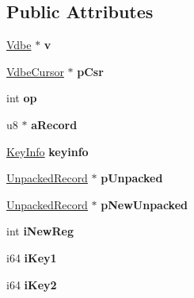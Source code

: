 \subsection*{Public Attributes}
\begin{DoxyCompactItemize}
\item 
\hyperlink{structVdbe}{Vdbe} $\ast$ {\bfseries v}\hypertarget{structPreUpdate_a6fccc7c418de1a789595f9814a4f5f81}{}\label{structPreUpdate_a6fccc7c418de1a789595f9814a4f5f81}

\item 
\hyperlink{structVdbeCursor}{Vdbe\+Cursor} $\ast$ {\bfseries p\+Csr}\hypertarget{structPreUpdate_a4716275b8f780b4f63f1a379a846c620}{}\label{structPreUpdate_a4716275b8f780b4f63f1a379a846c620}

\item 
int {\bfseries op}\hypertarget{structPreUpdate_aaecf3af9f7b62a4fd140d0d1300201cf}{}\label{structPreUpdate_aaecf3af9f7b62a4fd140d0d1300201cf}

\item 
u8 $\ast$ {\bfseries a\+Record}\hypertarget{structPreUpdate_a148cb72a74c7943828e02a5ce88ef662}{}\label{structPreUpdate_a148cb72a74c7943828e02a5ce88ef662}

\item 
\hyperlink{structKeyInfo}{Key\+Info} {\bfseries keyinfo}\hypertarget{structPreUpdate_a8bb920205df3c43820a81dcd3c1cf5bb}{}\label{structPreUpdate_a8bb920205df3c43820a81dcd3c1cf5bb}

\item 
\hyperlink{structUnpackedRecord}{Unpacked\+Record} $\ast$ {\bfseries p\+Unpacked}\hypertarget{structPreUpdate_ab43a1f36e6ab8c9aa8b1e52f1d80d07f}{}\label{structPreUpdate_ab43a1f36e6ab8c9aa8b1e52f1d80d07f}

\item 
\hyperlink{structUnpackedRecord}{Unpacked\+Record} $\ast$ {\bfseries p\+New\+Unpacked}\hypertarget{structPreUpdate_a70c572bb14af1dfdff8a1d6619548de0}{}\label{structPreUpdate_a70c572bb14af1dfdff8a1d6619548de0}

\item 
int {\bfseries i\+New\+Reg}\hypertarget{structPreUpdate_aadbf462d0c2b3d64387f9ece92ad2ed1}{}\label{structPreUpdate_aadbf462d0c2b3d64387f9ece92ad2ed1}

\item 
i64 {\bfseries i\+Key1}\hypertarget{structPreUpdate_a1d05fbd13495324e507658cd519cacbd}{}\label{structPreUpdate_a1d05fbd13495324e507658cd519cacbd}

\item 
i64 {\bfseries i\+Key2}\hypertarget{structPreUpdate_adeecdda5c18124870ad08b70832f7387}{}\label{structPreUpdate_adeecdda5c18124870ad08b70832f7387}


\end{DoxyCompactItemize}
